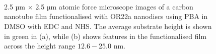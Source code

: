 \documentclass[
  a4paper,
]{scrbook}
\begin{document}
\begin{figure}
\begin{minipage}[t]{0.01\linewidth}
{~

}

\end{minipage}%
%
\begin{minipage}[t]{0.03\linewidth}

{\centering 


}

\end{minipage}%
%
\begin{minipage}[t]{0.01\linewidth}

{\centering 

~

}

\end{minipage}%
%
\begin{minipage}[t]{0.45\linewidth}

{\centering 


}

\end{minipage}%
%
\begin{minipage}[t]{0.01\linewidth}

{\centering 

~

}

\end{minipage}%

\caption{\label{fig-EDCNHS-AFM-comparison}2.5 µm \(\times\) 2.5 µm
atomic force microscope images of a carbon nanotube film functionalised
with OR22a nanodiscs using PBA in DMSO with EDC and NHS. The average
substrate height is shown in green in (a), while (b) shows features in
the functionalised film across the height range \(12.6-25.0\) nm.}

\end{figure}
\end{document}
